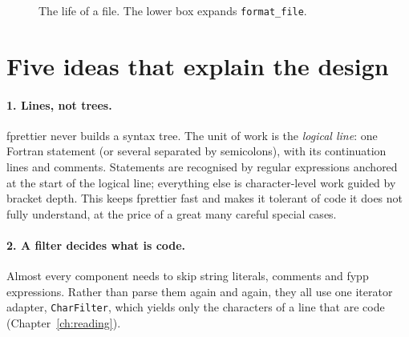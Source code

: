\documentclass[11pt,a4paper,openany]{book}
\newcommand{\code}[1]{\texttt{\small #1}}
\begin{document}
\begin{figure}[ht]
\caption{The life of a file. The lower box expands \code{format\_file}.}
\label{fig:pipeline}
\end{figure}

\section{Five ideas that explain the design}

\paragraph{1. Lines, not trees.} fprettier never builds a syntax tree. The
unit of work is the \emph{logical line}: one Fortran statement (or several
separated by semicolons), with its continuation lines and comments. Statements
are recognised by regular expressions anchored at the start of the logical
line; everything else is character-level work guided by bracket depth. This
keeps fprettier fast and makes it tolerant of code it does not fully
understand, at the price of a great many careful special cases.

\paragraph{2. A filter decides what is code.} Almost every component needs to
skip string literals, comments and fypp expressions. Rather than parse them
again and again, they all use one iterator adapter, \code{CharFilter}, which
yields only the characters of a line that are code (Chapter~\ref{ch:reading}).
\end{document}
